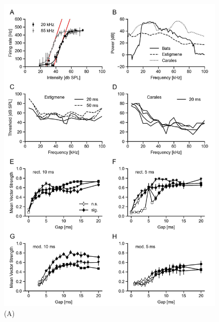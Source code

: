 \documentclass[12pt,a4paper,pdftex]{article}
\begin{document}
\begin{figure}[h!]
	\centering
	\includegraphics{figures/Fig_02.jpeg}
	\caption{\label{fig:02}(A)}
\end{figure}
\end{document}

